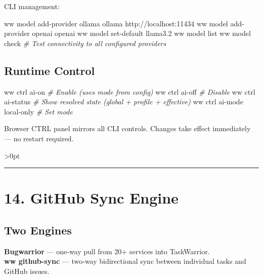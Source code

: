 \documentclass[11pt, a4paper, DIV=14]{scrartcl}
\newenvironment{Shaded}{%
  \vspace{4pt}%
  \begin{lrbox}{\ShadedBox}%
  \begin{minipage}{\dimexpr\linewidth-2\fboxsep\relax}%
  \vspace{4pt}%
}{%
  \vspace{4pt}%
  \end{minipage}%
  \end{lrbox}%
  \noindent\colorbox{CodeBg}{\usebox{\ShadedBox}}%
  \par\vspace{4pt}%
}
\newcommand{\CommentTok}[1]{\textcolor{BabbGray}{\textit{#1}}}
\newcommand{\ExtensionTok}[1]{#1}
\newcommand{\NormalTok}[1]{#1}
\newenvironment{Highlighting}{\ttfamily\fontsize{8.2}{11}\selectfont}{}
\let\origRule\rule
\renewcommand{\rule}[3][0pt]{%
  \ifnum\dimexpr#3\relax>0pt
    \par\vspace{2pt}\noindent{\color{BabbBorder}\origRule[#1]{#2}{#3}}\par\vspace{2pt}%
  \else
    \origRule[#1]{#2}{#3}%
  \fi
}
\begin{document}
CLI management:

\begin{Shaded}
\begin{Highlighting}[]
\ExtensionTok{ww}\NormalTok{ model add{-}provider ollama ollama http://localhost:11434}
\ExtensionTok{ww}\NormalTok{ model add{-}provider openai openai}
\ExtensionTok{ww}\NormalTok{ model set{-}default llama3.2}
\ExtensionTok{ww}\NormalTok{ model list}
\ExtensionTok{ww}\NormalTok{ model check          }\CommentTok{\# Test connectivity to all configured providers}
\end{Highlighting}
\end{Shaded}

\subsection{Runtime Control}\label{runtime-control}

\begin{Shaded}
\begin{Highlighting}[]
\ExtensionTok{ww}\NormalTok{ ctrl ai{-}on           }\CommentTok{\# Enable (uses mode from config)}
\ExtensionTok{ww}\NormalTok{ ctrl ai{-}off          }\CommentTok{\# Disable}
\ExtensionTok{ww}\NormalTok{ ctrl ai{-}status       }\CommentTok{\# Show resolved state (global + profile + effective)}
\ExtensionTok{ww}\NormalTok{ ctrl ai{-}mode local{-}only  }\CommentTok{\# Set mode}
\end{Highlighting}
\end{Shaded}

Browser CTRL panel mirrors all CLI controls. Changes take effect
immediately --- no restart required.

\begin{center}\rule{0.5\linewidth}{0.5pt}\end{center}

\section{14. GitHub Sync Engine}\label{github-sync-engine}

\subsection{Two Engines}\label{two-engines}

\textbf{Bugwarrior} --- one-way pull from 20+ services into
TaskWarrior.\\
\textbf{ww github-sync} --- two-way bidirectional sync between
individual tasks and GitHub issues.
\end{document}
